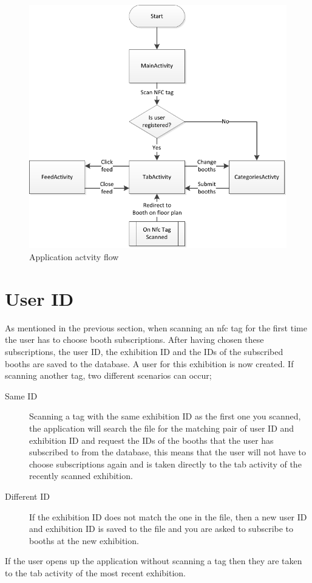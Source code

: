 \begin{figure}[H]
\centering
\includegraphics[width=\columnwidth]{img/appFlowchart.pdf}
\caption{Application actvity flow\label{fig:flowchart}}
\end{figure}

\section{User ID}
As mentioned in the previous section, when scanning an \ac{nfc} tag for the first time the user has to choose booth subscriptions. After having chosen these subscriptions, the user ID, the exhibition ID and the IDs of the subscribed booths are saved to the database. A user for this exhibition is now created. If scanning another tag, two different scenarios can occur;
\begin{description}
\item[Same ID] Scanning a tag with the same exhibition ID as the first one you scanned, the application will search the file for the matching pair of user ID and exhibition ID and request the IDs of the booths that the user has subscribed to from the database, this means that the user will not have to choose subscriptions again and is taken directly to the tab activity of the recently scanned exhibition. 
\item[Different ID] If the exhibition ID does not match the one in the file, then a new user ID and exhibition ID is saved to the file and you are asked to subscribe to booths at the new exhibition. 
\end{description}
If the user opens up the application without scanning a tag then they are taken to the tab activity of the most recent exhibition. 

